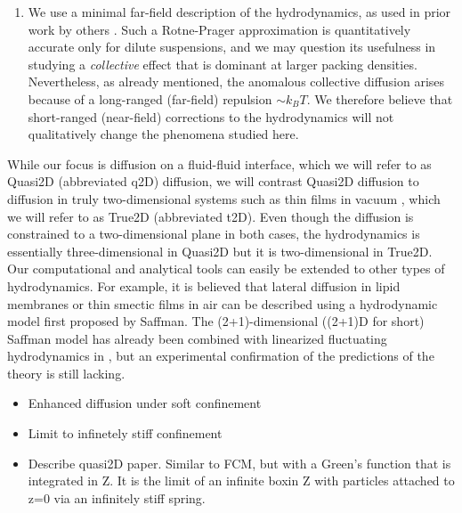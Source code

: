 \documentclass[ twoside,openright,titlepage,numbers=noenddot,%
headinclude,footinclude,cleardoublepage=empty,abstract=on,
BCOR=5mm,paper=a4,fontsize=11pt, dvipsnames
]{scrreprt}
\begin{document}
\begin{itemize}
\begin{enumerate}
\item We use a minimal far-field description of the hydrodynamics, as used in prior work by others \cite{ConfinedDiffusion_2D,DDFT_Diffusion_2D,Diffusion2D_IdealGas}.
Such a Rotne-Prager approximation is quantitatively accurate only for dilute suspensions, and we may question its usefulness in studying a \emph{collective }effect that is dominant at larger packing densities.
Nevertheless, as already mentioned, the anomalous collective diffusion arises because of a long-ranged (far-field) repulsion $\sim k_{B}T$.
We therefore believe that short-ranged (near-field) corrections to the hydrodynamics will not qualitatively change the phenomena studied here.
\end{enumerate}
While our focus is diffusion on a fluid-fluid interface, which we will refer to as Quasi2D (abbreviated q2D) diffusion, we will contrast Quasi2D diffusion to diffusion in truly two-dimensional systems such as thin films in vacuum \cite{ThinFilms_True2D}, which we will refer to as True2D (abbreviated t2D). Even though the diffusion is constrained to a two-dimensional plane in both cases, the hydrodynamics is essentially three-dimensional in Quasi2D but it is two-dimensional in True2D.
Our computational and analytical tools can easily be extended to other types of hydrodynamics. For example, it is believed that lateral diffusion in lipid membranes \cite{MembraneDiffusion_Review} or thin smectic films in air \cite{ThinFilms_HIs} can be described using a hydrodynamic model first proposed by Saffman. The (2+1)-dimensional ((2+1)D for short) Saffman model has already been combined with linearized fluctuating hydrodynamics in \cite{GiantFluctuations_ThinFilms}, but an experimental confirmation of the predictions of the theory is still lacking.

\end{itemize}




\begin{itemize}
\item Enhanced diffusion under soft confinement\cite{Pelaez2017}
\item Limit to infinetely stiff confinement\cite{Pelaez2018}
\item Describe quasi2D paper. Similar to \gls{FCM}, but with a Green's function that is integrated in Z. It is the limit of an infinite boxin Z with particles attached to z=0 via an infinitely stiff spring.
\end{itemize}
\end{document}

